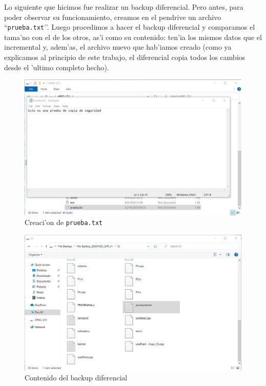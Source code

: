 \documentclass[11pt]{article}
\begin{document}
    Lo siguiente que hicimos fue realizar un backup diferencial. Pero antes, para poder observar su funcionamiento, creamos en el pendrive un archivo ``\texttt{prueba.txt}’’. Luego procedimos a hacer el backup diferencial y comparamos el tama'no con el de los otros, as'i como su contenido: ten'ia los mismos datos que el incremental y, adem'as, el archivo nuevo que hab'iamos creado (como ya explicamos al principio de este trabajo, el diferencial copia todos los cambios desde el 'ultimo completo hecho). 

    \begin{figure}[H]
		\centering
		\includegraphics[width=.8\textwidth]{Images/easeus/pendrive/9-pruebatxt.png}
		\caption{Creaci'on de \texttt{prueba.txt}}
	\end{figure}
	
	\begin{figure}[H]
		\centering
		\includegraphics[width=.8\textwidth]{Images/easeus/pendrive/10-t2_difv1_c1.png}
		\caption{Contenido del backup diferencial\footnotemark\/}
	\end{figure}
    
        
\end{document}
